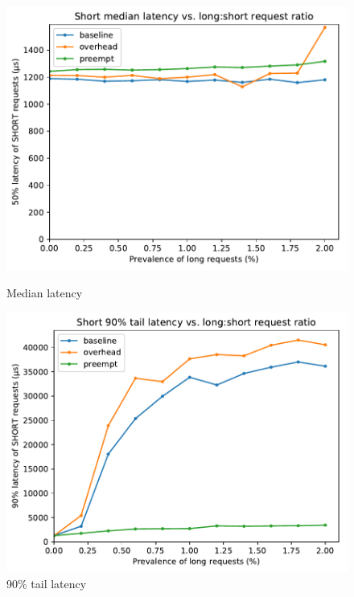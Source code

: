 \begin{figure}
	\begin{minipage}{\columnwidth}
	\includegraphics[width=\textwidth]{figs/twooom_50-short}
	\caption{Median latency}
	\end{minipage}
%
	\begin{minipage}{\columnwidth}
	\includegraphics[width=\textwidth]{figs/twooom_90-short}
	\caption{90\% tail latency}
	\end{minipage}


\end{figure}
